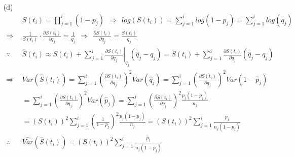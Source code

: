 \documentclass[paper=a4, fontsize=11pt]{scrartcl} %
\numberwithin{equation}{section} %
\numberwithin{figure}{section} %
\numberwithin{table}{section} %
\begin{document}
\begin{itemize}
	\item[(d)]{
		\begin{align*}
				&	S(t_i) = \prod_{j=1}^i(1-p_j)\ \ \Rightarrow	\ \ log\left( S(t_i) \right) = \sum_{j = 1}^i log(1-p_j)= \sum_{j = 1}^i log(q_j)	\\
	\Rightarrow\ \ 	&	\frac{1}{S(t_i)}\cdot\frac{\partial S(t_i)}{\partial q_j} = \frac{1}{q_j}\ \ \Rightarrow\ \ \frac{\partial S(t_i)}{\partial q_j} = \frac{S(t_i)}{q_j}\\
	\because\ \ 	&	\widehat{S}(t_i) \approx S(t_i)+\sum_{j=1}^i\left.\frac{\partial S(t_i)}{\partial q_j}\right |_{q_j}(\widehat{q}_j-q_j) = S(t_i)+\sum_{j=1}^i\frac{\partial S(t_i)}{\partial q_j}(\widehat{q}_j-q_j) \\
	\Rightarrow\ \ 	&	Var\left( \widehat{S}(t_i)\right) = \sum_{j=1}^{i} \left( \frac{\partial S(t_i)}{\partial q_j} \right)^2Var(\widehat{q}_j)=\sum_{j=1}^{i} \left( \frac{\partial S(t_i)}{\partial q_j} \right)^2Var(1-\widehat{p}_j)\\
				&=	\sum_{j= 1}^i\left( \frac{\partial S(t_i)}{\partial q_j} \right)^2Var(\widehat{p}_j) = \sum_{j= 1}^i\left( \frac{\partial S(t_i)}{\partial q_j} \right)^2\frac{p_j(1-p_j)}{n_j}\\
				&=	\left( S(t_i) \right)^2\sum_{j= 1}^i \left( \frac{1}{1-p_j}\right)^2 \frac{p_j(1-p_j)}{n_j} = \left( S(t_i) \right)^2\sum_{j= 1}^i \frac{p_j}{n_j(1-p_j)}\\
	\therefore	\ \ 	&	\widehat{Var}\left( \widehat{S}(t_i) \right)= \left( S(t_i) \right)^2\sum_{j= 1}^i \frac{\widehat{p}_j}{n_j(1-\widehat{p}_j)}
		\end{align*}
	}
\end{itemize}
\end{document}
